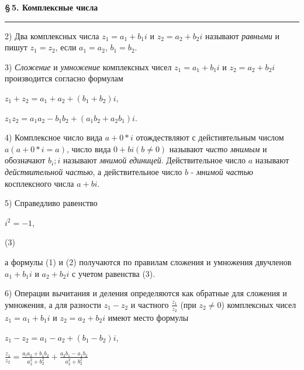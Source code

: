 \documentclass[a5paper, 10pt]{book}
\begin{document}
\newpage
    
\setcounter{page}{35}

    \begin{center}
    \textbf{\S\,5. Комплексные числа}
    \noindent\rule{\textwidth}{1pt}
    \end{center}
      \begin{spacing}
          \par2) Два комплексных числа $z_{1} = a_{1} + b_{1}i$ и $z_{2} = a_{2} + b_{2}i$ называют \textit{равными} и пишут $z_{1} = z_{2}$, если $a_{1} = a_{2}$, $b_{1} = b_{2}$.
          \par 3) \textit{Сложение} и \textit{умножение} комплексных чисел $z_{1} = a_{1} + b_{1}i$ и $z_{2} = a_{2} + b_{2}i$ производится согласно формулам
          \begin{center}
           $z_{1} + z_{2} = a_{1} + a_{2} + (b_{1} + b_{2})i$,
          \par $z_{1}z_{2} = a_{1}a_{2} - b_{1}b_{2} + (a_{1}b_{2} + a_{2}b_{1})i$.
           \end{center}
           \par 4) Комплексное число вида $a + 0*i$ отождествляют с дейстивтельным числом $a (a + 0*i = a)$, число вида $0 + bi (b \neq 0)$ называют \textit{чисто мнимым} и обозначают $b_{i}; i$ называют \textit{мнимой единицей}. Действительное число $a$ называют \textit{действительной частью}, а действительное число $b$ - \textit{мнимой частью} косплексного числа $a + bi$.
           \par 5) Справедливо равенство 
           \begin{center}
               $i^2 = -1$,  \begin{flushright} (3) \end{flushright}     
               \end{center}
           а формулы (1) и (2) получаются по правилам сложения и умножения двучленов $a_{1} + b_{1}i$ и $a_{2} + b_{2}i$ с учетом равенства (3).
           \par 6) Операции вычитания и деления определяются как обратные для сложения и умножения, а для разности $z_{1} - z_{2}$ и частного $\frac{z_{1}}{z_{2}}$ (при $z_{2} \neq 0$) комплексных чисел $z_{1} = a_{1} + b_{1}i$ и $z_{2} = a_{2} + b_{2}i$ имеют место формулы
           \begin{center}
               $z_{1} - z_{2} = a_{1} - a_{2} + (b_{1} - b_{2})i$,
               \par $\frac{z_{1}}{z_{2}} = \frac{a_{!}a_{2} + b_{1}b_{2}}{a^2_{2} + b^2_{2}} + \frac{a_{2}b_{1} - a_{1}b_{2}}{a^2_{2} + b^2_{2}}$

\end{center}
\end{spacing}
\end{document}
